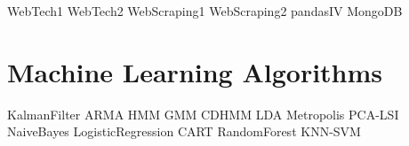 \documentclass[nociteref]{SIAM-GH-book}
\begin{document}
{WebTech1}
{WebTech2}
{WebScraping1}
{WebScraping2}
{pandasIV}
{MongoDB}

\part{Machine Learning Algorithms} %
{KalmanFilter}
{ARMA}
{HMM}
{GMM}
{CDHMM}
{LDA}
{Metropolis}
{PCA-LSI}
{NaiveBayes}
{LogisticRegression}
{CART}
{RandomForest}
{KNN-SVM}
\end{document}

